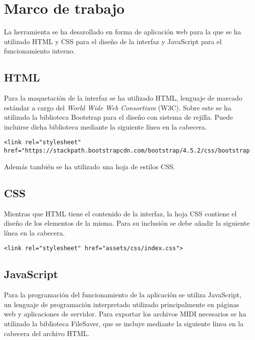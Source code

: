 \section{Marco de trabajo}

La herramienta se ha desarollado en forma de aplicación web para la que se ha utilizado HTML y CSS para el diseño de la interfaz y JavaScript para el funcionamiento interno.

\subsection{HTML}

Para la maquetación de la interfaz se ha utilizado HTML, lenguaje de marcado estándar a cargo del \textit{World Wide Web Consortium} (W3C). Sobre este se ha utilizado la biblioteca Bootstrap para el diseño con sistema de rejilla. Puede incluirse dicha biblioteca mediante la siguiente línea en la cabecera.

\begin{lstlisting}
<link rel="stylesheet" href="https://stackpath.bootstrapcdn.com/bootstrap/4.5.2/css/bootstrap.min.css">
\end{lstlisting}

Además también se ha utilizado una hoja de estilos CSS.

\subsection{CSS}

Mientras que HTML tiene el contenido de la interfaz, la hoja CSS contiene el diseño de los elementos de la misma. Para su inclusión se debe añadir la siguiente línea en la cabecera.

\begin{lstlisting}
<link rel="stylesheet" href="assets/css/index.css">
\end{lstlisting}

\subsection{JavaScript}

Para la programación del funcionamiento de la aplicación se utiliza JavaScript, un lenguaje de programación interpretado utilizado principalmente en páginas web y aplicaciones de servidor. Para exportar los archivos MIDI necesarios se ha utilizado la biblioteca FileSaver, que se incluye mediante la siguiente línea en la cabecera del archivo HTML.

